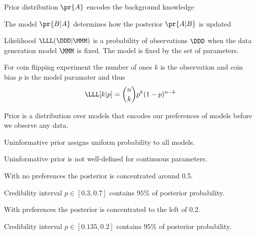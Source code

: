 \documentclass[landscape,footrule]{foils}
\begin{document}

\vspace*{1cm}
\begin{triangles}
\item Prior distribution $\pr{A}$ encodes the background knowledge
\item The model $\pr{B|A}$  determines how the posterior $\pr{A|B}$ is updated 
\end{triangles}


Likelihood $\LLL(\DDD|\MMM)$ is a probability of observations $\DDD$ when the data generation model $\MMM$ is fixed.
The model is fixed by the set of parameters.

For coin flipping experiment the number of ones $k$ is the observation and coin bias $p$ is the model paramater and thus
\begin{align*}
\LLL[k|p]=\binom{n}{k}p^k(1-p)^{n-k}
\end{align*}

Prior is a distribution over models that encodes our preferences of models before we observe any data.
\begin{triangles}
\item Uninformative prior assigns uniform probability to all models.
\item Uninformative prior is not well-defined for continuous parameters.  
\end{triangles}
   


\vspace*{-0.5cm}

\begin{triangles}
\item With no preferences the posterior is concentrated around 0.5.
\item Credibility interval $p\in[0.3,0.7]$ contains $95\%$ of posterior probability.
\end{triangles}


\vspace*{-0.5cm}

\begin{triangles}
\item With preferences the posterior is concentrated to the left of 0.2.
\item Credibility interval $p\in[0.135,0.2]$ contains $95\%$ of posterior probability.
\end{triangles}
\end{document}
